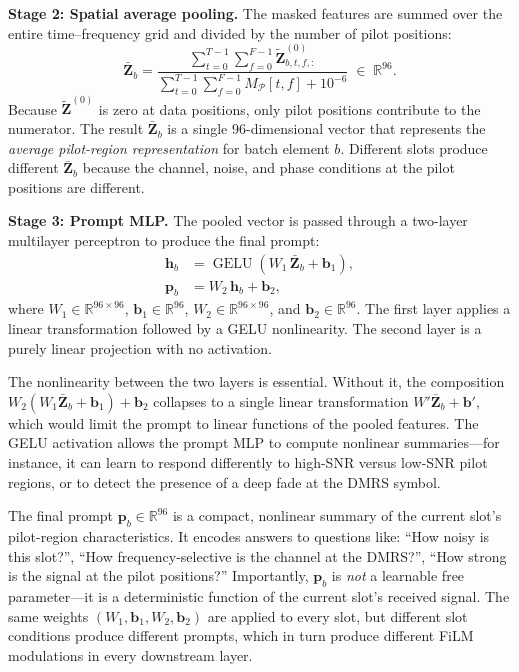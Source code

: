 \documentclass[11pt,a4paper]{article}
\newcommand{\bZ}{\mathbf{Z}}
\newcommand{\bp}{\mathbf{p}}
\newcommand{\bh}{\mathbf{h}}
\DeclareMathOperator{\GELU}{GELU}
\begin{document}
	\medskip\noindent
	\textbf{Stage 2: Spatial average pooling.}\quad
	The masked features are summed over the entire time--frequency grid and divided by the number of pilot positions:
	\begin{equation}
		\bar{\bZ}_b = \frac{\displaystyle\sum_{t=0}^{T-1}\sum_{f=0}^{F-1} \widetilde{\bZ}^{(0)}_{b,t,f,:}}{\displaystyle\sum_{t=0}^{T-1}\sum_{f=0}^{F-1} M_\mathcal{P}[t,f] + 10^{-6}} \;\in\; \mathbb{R}^{96}.
		\label{eq:prompt_pool}
	\end{equation}
	Because $\widetilde{\bZ}^{(0)}$ is zero at data positions, only pilot positions contribute to the numerator.  The result $\bar{\bZ}_b$ is a single 96-dimensional vector that represents the \emph{average pilot-region representation} for batch element $b$.  Different slots produce different $\bar{\bZ}_b$ because the channel, noise, and phase conditions at the pilot positions are different.
	
	\medskip\noindent
	\textbf{Stage 3: Prompt MLP.}\quad
	The pooled vector is passed through a two-layer multilayer perceptron to produce the final prompt:
	\begin{align}
		\bh_b &= \GELU\!\left(W_1\,\bar{\bZ}_b + \mathbf{b}_1\right), \label{eq:prompt_mlp1} \\
		\bp_b &= W_2\,\bh_b + \mathbf{b}_2, \label{eq:prompt_mlp2}
	\end{align}
	where $W_1 \in \mathbb{R}^{96 \times 96}$, $\mathbf{b}_1 \in \mathbb{R}^{96}$, $W_2 \in \mathbb{R}^{96 \times 96}$, and $\mathbf{b}_2 \in \mathbb{R}^{96}$.  The first layer applies a linear transformation followed by a GELU nonlinearity.  The second layer is a purely linear projection with no activation.
	
	\begin{warning}
		The nonlinearity between the two layers is essential.  Without it, the composition $W_2(W_1 \bar{\bZ}_b + \mathbf{b}_1) + \mathbf{b}_2$ collapses to a single linear transformation $W'\bar{\bZ}_b + \mathbf{b}'$, which would limit the prompt to linear functions of the pooled features.  The GELU activation allows the prompt MLP to compute nonlinear summaries---for instance, it can learn to respond differently to high-SNR versus low-SNR pilot regions, or to detect the presence of a deep fade at the DMRS symbol.
	\end{warning}
	
	The final prompt $\bp_b \in \mathbb{R}^{96}$ is a compact, nonlinear summary of the current slot's pilot-region characteristics.  It encodes answers to questions like: ``How noisy is this slot?'', ``How frequency-selective is the channel at the DMRS?'', ``How strong is the signal at the pilot positions?''  Importantly, $\bp_b$ is \emph{not} a learnable free parameter---it is a deterministic function of the current slot's received signal.  The same weights $(W_1, \mathbf{b}_1, W_2, \mathbf{b}_2)$ are applied to every slot, but different slot conditions produce different prompts, which in turn produce different FiLM modulations in every downstream layer.
	
\end{document}
